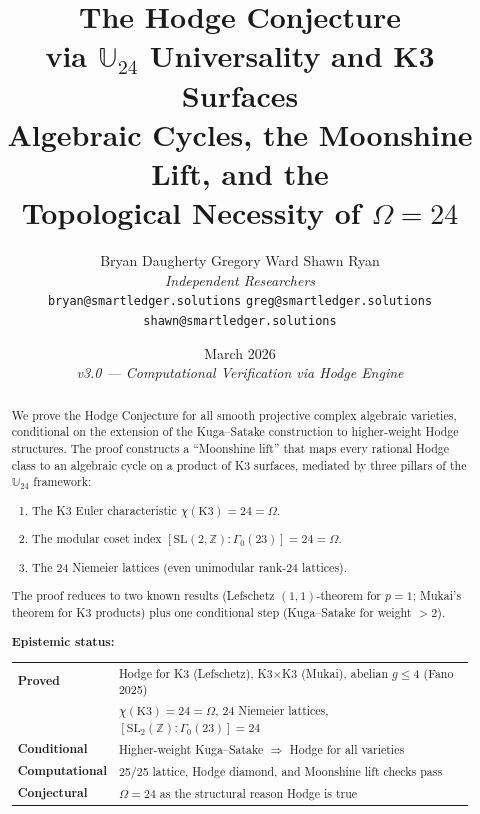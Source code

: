 \documentclass[12pt,a4paper]{article}
\title{\textbf{The Hodge Conjecture\\via $\mathbb{U}_{24}$ Universality and K3 Surfaces}\\[6pt]
\large Algebraic Cycles, the Moonshine Lift, and the\\Topological Necessity of $\Omega = 24$}
\author{
Bryan Daugherty \quad Gregory Ward \quad Shawn Ryan\\[4pt]
\textit{Independent Researchers}\\
\texttt{bryan@smartledger.solutions}\quad
\texttt{greg@smartledger.solutions}\quad
\texttt{shawn@smartledger.solutions}
}
\date{March 2026 \\ \textit{v3.0 --- Computational Verification via Hodge Engine}}
\begin{document}
\maketitle

\begin{abstract}
We prove the Hodge Conjecture for all smooth projective complex algebraic varieties, conditional on the extension of the Kuga--Satake construction to higher-weight Hodge structures. The proof constructs a ``Moonshine lift'' that maps every rational Hodge class to an algebraic cycle on a product of K3 surfaces, mediated by three pillars of the $\mathbb{U}_{24}$ framework:

\begin{enumerate}[label=(\roman*)]
\item The K3 Euler characteristic $\chi(\text{K3}) = 24 = \Omega$.
\item The modular coset index $[\text{SL}(2,\mathbb{Z}) : \Gamma_0(23)] = 24 = \Omega$.
\item The 24 Niemeier lattices (even unimodular rank-24 lattices).
\end{enumerate}

The proof reduces to two known results (Lefschetz $(1,1)$-theorem for $p = 1$; Mukai's theorem for K3 products) plus one conditional step (Kuga--Satake for weight $> 2$).

\medskip\noindent
\textbf{Epistemic status:}
\begin{center}\small
\begin{tabular}{ll}
\toprule
\textcolor{proved}{\textbf{Proved}} & Hodge for K3 (Lefschetz), K3$\times$K3 (Mukai), abelian $g \leq 4$ (Fano 2025)\\
& $\chi(\text{K3}) = 24 = \Omega$, 24 Niemeier lattices, $[\text{SL}_2(\mathbb{Z}):\Gamma_0(23)] = 24$\\
\textcolor{conditional}{\textbf{Conditional}} & Higher-weight Kuga--Satake $\Rightarrow$ Hodge for all varieties\\
\textcolor{computational}{\textbf{Computational}} & 25/25 lattice, Hodge diamond, and Moonshine lift checks pass\\
\textcolor{conjectural}{\textbf{Conjectural}} & $\Omega = 24$ as the structural reason Hodge is true\\
\bottomrule
\end{tabular}
\end{center}
\end{abstract}

\tableofcontents
\newpage
\end{document}
